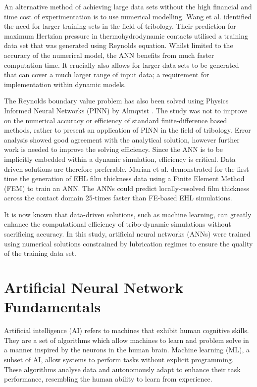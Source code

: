 An alternative method of achieving large data sets without the high financial and time cost of experimentation is to use numerical modelling. Wang et al. \cite{Wang2020} identified the need for larger training sets in the field of tribology. Their prediction for maximum Hertzian pressure in thermohydrodynamic contacts utilised a training data set that was generated using Reynolds equation. Whilst limited to the accuracy of the numerical model, the ANN benefits from much faster computation time. It crucially also allows for larger data sets to be generated that can cover a much larger range of input data; a requirement for implementation within dynamic models.

The Reynolds boundary value problem has also been solved using Physics Informed Neural Networks (PINN) by Almqvist \cite{Almqvist2021}. The study was not to improve on the numerical accuracy or efficiency of standard finite-difference based methods, rather to present an application of PINN in the field of tribology. Error analysis showed good agreement with the analytical solution, however further work is needed to improve the solving efficiency. Since the ANN is to be implicitly embedded within a dynamic simulation, efficiency is critical. Data driven solutions are therefore preferable. Marian et al. \cite{Marian2022} demonstrated for the first time the generation of EHL film thickness data using a Finite Element Method (FEM) to train an ANN. The ANNs could predict locally-resolved film thickness across the contact domain 25-times faster than FE-based EHL simulations.


It is now known that data-driven solutions, such as machine learning, can greatly enhance the computational efficiency of tribo-dynamic simulations without sacrificing accuracy. In this study, artificial neural networks (ANNs) were trained using numerical solutions constrained by lubrication regimes to ensure the quality of the training data set.


\section{Artificial Neural Network Fundamentals}

Artificial intelligence (AI) refers to machines that exhibit human cognitive skills. They are a set of algorithms which allow machines to learn and problem solve in a manner inspired by the neurons in the human brain. Machine learning (ML), a subset of AI, allow systems to perform tasks without explicit programming. These algorithms analyse data and autonomously adapt to enhance their task performance, resembling the human ability to learn from experience. 

